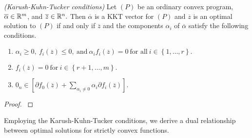 \begin{ftheorem}
  \emph{(Karush-Kuhn-Tucker conditions)}
  Let $(P)$
  be an ordinary convex program,
  $
  \overline{\alpha}
  \in \mathbb{R}^m
  $,
   and 
   $
   \overline{z}
   \in \mathbb{R}^n.
   $
   Then 
   $
  \overline{\alpha}
   $
   is a KKT vector for $(P)$
   and 
   $
   \overline{z}
   $
   is an optimal solution to $(P)$
   if and only if 
   $
   \overline{z}
   $
   and 
   the components $\alpha_i$ of
   $
  \overline{\alpha}
   $
   satisfy 
   the following conditions.

  \begin{enumerate}[label={(\roman*)}]
    \item
      $
        \alpha_i \ge 0,
        \ 
        f_i(
   \overline{z}
        )
        \le 0,
        \ 
        \text{and}
        \ 
        \alpha_i 
        f_i(
   \overline{z}
        )
        =0
        \ 
        \text{for all}
        \ 
        i\in \left\{ 1, \ldots, r \right\}
        .
      $
      \item
        $
        f_i(
   \overline{z}
        )
        =0
        \ 
        \text{for}
        \ 
        i\in \left\{ r+1, \ldots, m \right\}
        .
        $
      \item
        $
         0
         _n
         \in 
         [
          \partial
        f_0(
   \overline{z}
        )
        +
        \sum_{\alpha_i\neq 0}
        \alpha_i 
        \partial
        f_i(
   \overline{z}
        )
         ]
.
        $
  \end{enumerate}
\end{ftheorem}
\begin{proof}
  \cite[Theorem~28.3]{Rockafellar1970}
\end{proof}

\begin{takeaways}
  Employing the Karush-Kuhn-Tucker conditions, we
  derive a dual relationship between optimal solutions
  for strictly convex functions.
\end{takeaways}
